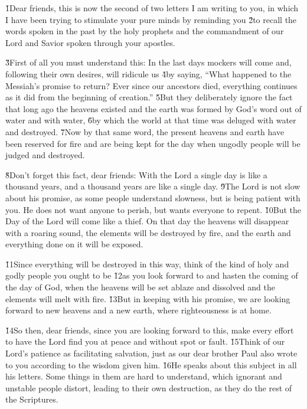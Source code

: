 \v{1}Dear friends, this is now the second of two letters I am writing to you, in which I have been trying to stimulate your pure minds by reminding you \v{2}to recall the words spoken in the past by the holy prophets and the commandment of our Lord and Savior spoken through your apostles.

\v{3}First of all you must understand this: In the last days mockers will come and, following their own desires, will ridicule us \v{4}by saying, ``What happened to the Messiah's promise to return? Ever since our ancestors died, everything continues as it did from the beginning of creation.'' \v{5}But they deliberately ignore the fact that long ago the heavens existed and the earth was formed by God's word out of water and with water, \v{6}by which the world at that time was deluged with water and destroyed. \v{7}Now by that same word, the present heavens and earth have been reserved for fire and are being kept for the day when ungodly people will be judged and destroyed.

\v{8}Don't forget this fact, dear friends: With the Lord a single day is like a thousand years, and a thousand years are like a single day. \v{9}The Lord is not slow about his promise, as some people understand slowness, but is being patient with you. He does not want anyone to perish, but wants everyone to repent. \v{10}But the Day of the Lord will come like a thief. On that day the heavens will disappear with a roaring sound, the elements will be destroyed by fire, and the earth and everything done on it will be exposed.

\v{11}Since everything will be destroyed in this way, think of the kind of holy and godly people you ought to be \v{12}as you look forward to and hasten the coming of the day of God, when the heavens will be set ablaze and dissolved and the elements will melt with fire. \v{13}But in keeping with his promise, we are looking forward to new heavens and a new earth, where righteousness is at home.

\v{14}So then, dear friends, since you are looking forward to this, make every effort to have the Lord find you at peace and without spot or fault. \v{15}Think of our Lord's patience as facilitating salvation, just as our dear brother Paul also wrote to you according to the wisdom given him. \v{16}He speaks about this subject in all his letters. Some things in them are hard to understand, which ignorant and unstable people distort, leading to their own destruction, as they do the rest of the Scriptures.

